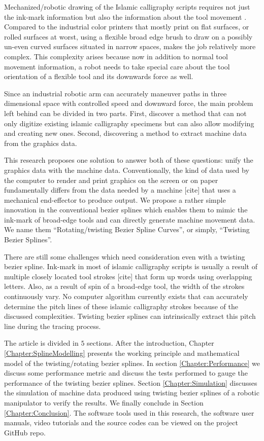{    Mechanized/robotic drawing of the Islamic calligraphy scripts requires not just the ink-mark information but also the information about the tool movement \cite{bib03}. Compared to the industrial color printers that mostly print on flat surfaces, or rolled surfaces at worst, using a flexible broad edge brush to draw on a possibly un-even curved surfaces situated in narrow spaces, makes the job relatively more complex. This complexity arises because now in addition to normal tool movement information, a robot needs to take special care about the tool orientation of a flexible tool and its downwards force as well.

    Since an industrial robotic arm can accurately maneuver paths in three dimensional space with controlled speed and downward force, the main problem left behind can be divided in two parts. First, discover a method that can not only digitize existing islamic calligraphy specimens but can also allow modifying and creating new ones. Second, discovering a method to extract machine data from the graphics data.

    This research proposes one solution to answer both of these questions: unify the graphics data with the machine data. Conventionally, the kind of data used by the computer to render and print graphics on the screen or on paper fundamentally differs from the data needed by a machine [cite] that uses a mechanical end-effector to produce output. We propose a rather simple innovation in the conventional bezier splines which enables them to mimic the ink-mark of broad-edge tools and can directly generate machine movement data. We name them ``Rotating/twisting Bezier Spline Curves'', or simply, ``Twisting Bezier Splines''.

    There are still some challenges which need consideration even with a twisting bezier spline. Ink-mark in most of islamic calligraphy scripts is usually a result of multiple closely located tool strokes [cite] that form up words using overlapping letters. Also, as a result of spin of a broad-edge tool, the width of the strokes continuously vary. No computer algorithm currently exists that can accurately determine the pitch lines of these islamic calligraphy strokes because of the discussed complexities. Twisting bezier splines can intrinsically extract this pitch line during the tracing process.

    The article is divided in $5$ sections. After the introduction, Chapter \ref{Chapter:SplineModelling} presents the working principle and mathematical model of the twisting/rotating bezier splines. In section \ref{Chapter:Performance} we discuss some performance metric and discuss the tests performed to gauge the performance of the twisting bezier splines. Section \ref{Chapter:Simulation} discusses the simulation of machine data produced using twisting bezier splines of a robotic manipulator to verify the results. We finally conclude in Section \ref{Chapter:Conclusion}. The software tools used in this research, the software user manuals, video tutorials and the source codes can be viewed on the project GitHub repo\cite{bib20}.
}
